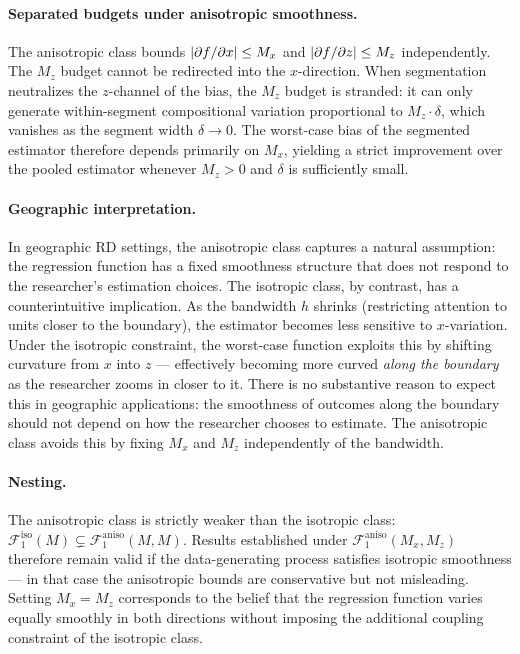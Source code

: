 \paragraph{Separated budgets under anisotropic smoothness.}
The anisotropic class bounds $\lvert\partial f / \partial x\rvert \leq M_x$ and $\lvert\partial f / \partial z\rvert \leq M_z$ independently.
The $M_z$ budget cannot be redirected into the $x$-direction.
When segmentation neutralizes the $z$-channel of the bias, the $M_z$ budget is stranded: it can only generate within-segment compositional variation proportional to $M_z \cdot \delta$, which vanishes as the segment width $\delta \to 0$.
The worst-case bias of the segmented estimator therefore depends primarily on $M_x$, yielding a strict improvement over the pooled estimator whenever $M_z > 0$ and $\delta$ is sufficiently small.

\paragraph{Geographic interpretation.}
In geographic RD settings, the anisotropic class captures a natural assumption: the regression function has a fixed smoothness structure that does not respond to the researcher's estimation choices.
The isotropic class, by contrast, has a counterintuitive implication.
As the bandwidth $h$ shrinks (restricting attention to units closer to the boundary), the estimator becomes less sensitive to $x$-variation.
Under the isotropic constraint, the worst-case function exploits this by shifting curvature from $x$ into $z$ --- effectively becoming more curved \emph{along the boundary} as the researcher zooms in closer to it.
There is no substantive reason to expect this in geographic applications: the smoothness of outcomes along the boundary should not depend on how the researcher chooses to estimate.
The anisotropic class avoids this by fixing $M_x$ and $M_z$ independently of the bandwidth.

\paragraph{Nesting.}
The anisotropic class is strictly weaker than the isotropic class: $\mathcal{F}_1^{\mathrm{iso}}(M) \subsetneq \mathcal{F}_1^{\mathrm{aniso}}(M, M)$.
Results established under $\mathcal{F}_1^{\mathrm{aniso}}(M_x, M_z)$ therefore remain valid if the data-generating process satisfies isotropic smoothness --- in that case the anisotropic bounds are conservative but not misleading.
Setting $M_x = M_z$ corresponds to the belief that the regression function varies equally smoothly in both directions without imposing the additional coupling constraint of the isotropic class.
